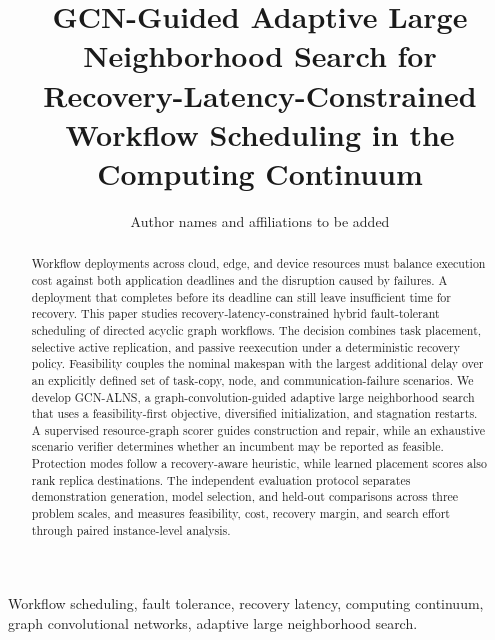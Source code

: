 \documentclass[journal]{IEEEtran}
\title{GCN-Guided Adaptive Large Neighborhood Search for Recovery-Latency-Constrained Workflow Scheduling in the Computing Continuum}
\author{Author names and affiliations to be added}
\begin{document}
\maketitle

\begin{abstract}
Workflow deployments across cloud, edge, and device resources must balance
execution cost against both application deadlines and the disruption caused by
failures. A deployment that completes before its deadline can still leave
insufficient time for recovery. This paper studies recovery-latency-constrained
hybrid fault-tolerant scheduling of directed acyclic graph workflows. The
decision combines task placement, selective active replication, and passive
reexecution under a deterministic recovery policy. Feasibility couples the
nominal makespan with the largest additional delay over an explicitly defined
set of task-copy, node, and communication-failure scenarios. We develop
GCN-ALNS, a graph-convolution-guided adaptive large neighborhood search that
uses a feasibility-first objective, diversified initialization, and stagnation
restarts. A supervised resource-graph scorer guides construction and repair,
while an exhaustive scenario verifier determines whether an incumbent may be
reported as feasible. Protection modes follow a recovery-aware heuristic,
while learned placement scores also rank replica destinations. The independent
evaluation protocol separates demonstration generation, model selection, and
held-out comparisons across three problem scales, and measures feasibility,
cost, recovery margin, and search effort through paired instance-level
analysis.
\end{abstract}

\begin{IEEEkeywords}
Workflow scheduling, fault tolerance, recovery latency, computing continuum,
graph convolutional networks, adaptive large neighborhood search.
\end{IEEEkeywords}












\end{document}
